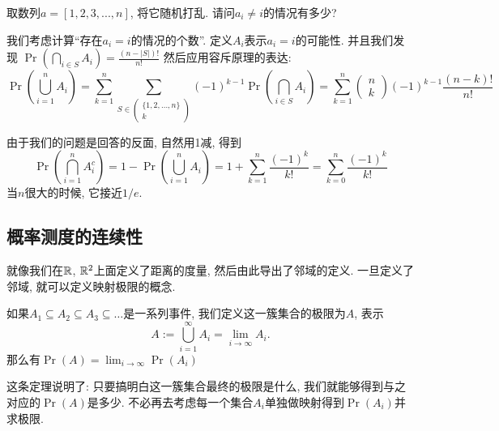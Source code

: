 \documentclass{ctexart}
\begin{document}
\begin{example}[错排问题]
    取数列$a=[1,2,3, ..., n]$, 将它随机打乱. 请问$a_i \neq i$的情况有多少?

     我们考虑计算``存在$a_i=i$的情况的个数''. 定义$A_i$表示$a_i=i$的可能性. 并且我们发现  $\operatorname{Pr}\left(\bigcap_{i \in S} A_i\right)=\frac{(n-|S|) !}{n !}$  然后应用容斥原理的表达: 
$$\operatorname{Pr}\left(\bigcup_{i=1}^n A_i\right)=\sum_{k=1}^n \sum_{S \in\left(\begin{array}{c}\{1,2, \ldots, n\} \\ k\end{array}\right)}(-1)^{k-1} \operatorname{Pr}\left(\bigcap_{i \in S} A_i\right)=\sum_{k=1}^n\left(\begin{array}{l}n \\ k\end{array}\right)(-1)^{k-1} \frac{(n-k) !}{n !}$$


由于我们的问题是回答的反面, 自然用1减, 得到
$$
\operatorname{Pr}\left(\bigcap_{i=1}^n A_i^c\right)=1-\operatorname{Pr}\left(\bigcup_{i=1}^n A_i\right)=1+\sum_{k=1}^n \frac{(-1)^k}{k !}=\sum_{k=0}^n \frac{(-1)^k}{k !}
$$
当$n$很大的时候, 它接近$1/e$. 
    
\end{example}

\subsection{概率测度的连续性}

就像我们在$\mathbb R$, $\mathbb R^2$上面定义了距离的度量, 然后由此导出了邻域的定义. 一旦定义了邻域, 就可以定义映射极限的概念.

\begin{theorem}[概率测度是连续的]
    如果$A_1 \subseteq A_2 \subseteq A_3 \subseteq \ldots$是一系列事件, 我们定义这一簇集合的极限为$A$, 表示
    \[
        A:=\bigcup_{i=1}^\infty A_i = \lim_{i\to  \infty}A_i.
    \]
    那么有$\operatorname{Pr}(A)=\lim _{i \rightarrow \infty} \operatorname{Pr}\left(A_i\right)$
    
\end{theorem}

这条定理说明了: 只要搞明白这一簇集合最终的极限是什么, 我们就能够得到与之对应的$\Pr(A)$是多少. 不必再去考虑每一个集合$A_i$单独做映射得到$\Pr(A_i)$并求极限. 
\end{document}
